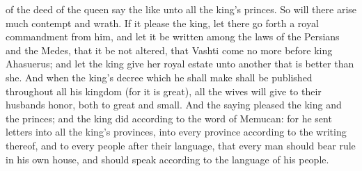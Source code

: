 of the deed of the queen say the like unto all the king’s princes. So will there arise much contempt and wrath. If it please the king, let there go forth a royal commandment from him, and let it be written among the laws of the Persians and the Medes, that it be not altered, that Vashti come no more before king Ahasuerus; and let the king give her royal estate unto another that is better than she. And when the king’s decree which he shall make shall be published throughout all his kingdom (for it is great), all the wives will give to their husbands honor, both to great and small. And the saying pleased the king and the princes; and the king did according to the word of Memucan: for he sent letters into all the king’s provinces, into every province according to the writing thereof, and to every people after their language, that every man should bear rule in his own house, and should speak according to the language of his people. 

